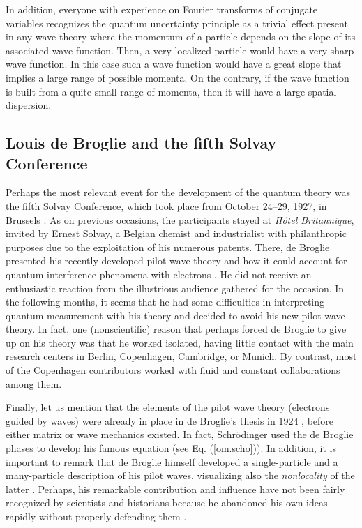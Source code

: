 \documentclass[nofootinbib, secnumarabic, amsmath, nobibnotes,10pt,aps,pra]{revtex4-1}
\newcommand{\eref}[1]{Eq. (\ref{#1})}
\begin{document}
In addition, everyone with experience on Fourier transforms of
conjugate variables recognizes the quantum uncertainty principle as
a trivial effect present in any wave theory where the momentum of a
particle depends on the slope of its associated wave function. Then,
a very localized particle would have a very sharp wave function.
In this case such a wave function would have a great slope that implies
a large range of possible momenta. On the contrary, if the wave
function is built from a quite small range of momenta, then it will
have a large spatial dispersion.


\subsection{Louis de Broglie and the fifth Solvay Conference}\label{om.sec_intro.5}

Perhaps the most relevant event for the development of the quantum
theory was the fifth Solvay Conference, which took place from
October 24--29, 1927, in Brussels \cite{om.valentini2009Solvay}. As
on previous occasions, the participants stayed at \textit{H\^{o}tel
Britannique}, invited by Ernest Solvay, a Belgian chemist and
industrialist with philanthropic purposes due to the exploitation of
his numerous patents. There, de Broglie presented his recently
developed pilot wave theory and how it could account for quantum
interference phenomena with electrons \cite{om.valentini2009Solvay}.
He did not receive an enthusiastic reaction from the illustrious
audience gathered for the occasion. In the following months, it
seems that he had some difficulties in interpreting quantum
measurement with his theory and decided to avoid his new pilot wave theory. In fact, one
(nonscientific) reason that perhaps forced de Broglie to give up on his
theory was that he worked isolated, having little contact with the
main research centers in Berlin, Copenhagen, Cambridge, or Munich.
By contrast, most of the Copenhagen contributors worked with fluid
and constant collaborations among them.

Finally, let us mention that the elements of the pilot wave theory
(electrons guided by waves) were already in place in de Broglie's
thesis in 1924 \cite{om.debroglie1923}, before either matrix or wave
mechanics existed. In fact, Schr\"odinger used the de Broglie phases
to develop his famous equation (see \eref{om.scho}). In addition, it
is important to remark that de Broglie himself developed a
single-particle and a many-particle description of his pilot waves,
visualizing also the \textit{nonlocality} of the latter
\cite{om.valentini2009Solvay}. Perhaps, his remarkable contribution
and influence have not been fairly recognized by scientists and
historians because he abandoned his own ideas rapidly without properly
defending them \cite{om.valentini2009Solvay,om.Broglie1956}.
\end{document}
